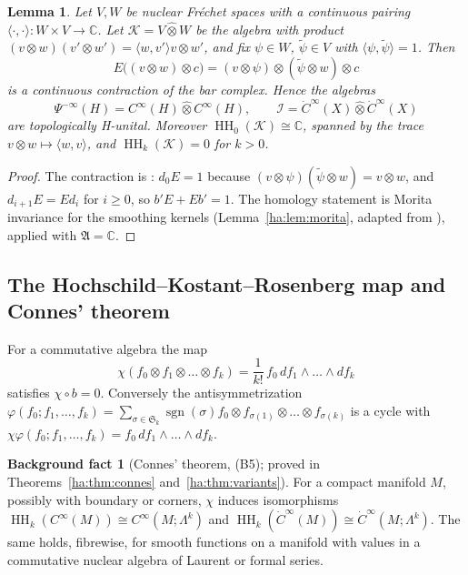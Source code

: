 \documentclass[11pt,oneside,reqno]{article}
\DeclareMathOperator{\HH}{HH}
\DeclareMathOperator{\sgn}{sgn}
\newcommand{\C}{\mathbb C}
\newcommand{\cI}{\mathcal I}
\newcommand{\CI}{C^\infty}
\newcommand{\dCI}{\dot C^\infty}
\theoremstyle{plain}
\newtheorem{lemma}[theorem]{Lemma}
\theoremstyle{definition}
\newtheorem{background}[theorem]{Background fact}
\theoremstyle{remark}
\begin{document}
\begin{lemma}\label{lem:Hunital}
Let \(V,W\) be nuclear Fr\'echet spaces with a continuous pairing
\(\langle\cdot,\cdot\rangle:W\times V\to\C\). Let \(\mathcal K=V\widehat
\otimes W\) be the algebra with product \((v\otimes w)(v'\otimes w')=\langle
w,v'\rangle v\otimes w'\), and fix \(\psi\in W\), \(\tilde\psi\in V\) with
\(\langle\psi,\tilde\psi\rangle=1\). Then
\[
 E\bigl((v\otimes w)\otimes c\bigr)=(v\otimes\psi)\otimes(\tilde\psi\otimes
 w)\otimes c
\]
is a continuous contraction of the bar complex. Hence the algebras
\[
 \Psi^{-\infty}(H)=\CI(H)\widehat\otimes\CI(H),\qquad
 \cI=\dCI(X)\widehat\otimes\dCI(X)
\]
are topologically H-unital.
Moreover \(\HH_0(\mathcal K)\cong\C\), spanned by the trace
\(v\otimes w\mapsto\langle w,v\rangle\), and \(\HH_k(\mathcal K)=0\) for
\(k>0\).
\end{lemma}

\begin{proof}
The contraction is \cite[Lemma ``Explicit contractions'']{HHb}:
\(d_0E=1\) because \((v\otimes\psi)(\tilde\psi\otimes w)=v\otimes w\), and
\(d_{i+1}E=Ed_i\) for \(i\ge0\), so \(b'E+Eb'=1\). The homology statement is
Morita invariance for the smoothing kernels
(Lemma~\ref{ha:lem:morita}, adapted from \cite[Lemma ``Morita invariance
for smoothing kernels'']{HHb}), applied with \(\mathfrak A=\C\).
\end{proof}

\subsection{The Hochschild--Kostant--Rosenberg map and Connes' theorem}
\label{subsec:HKR}
For a commutative algebra the map \cite[after (26)]{MN}
\[
 \chi(f_0\otimes f_1\otimes\dots\otimes f_k)=\frac1{k!}\,f_0\,df_1\wedge
 \dots\wedge df_k
\]
satisfies \(\chi\circ b=0\). Conversely the antisymmetrization
\(\varphi(f_0;f_1,\dots,f_k)=\sum_{\sigma\in\mathfrak S_k}\sgn(\sigma)f_0
\otimes f_{\sigma(1)}\otimes\dots\otimes f_{\sigma(k)}\) is a cycle with
\(\chi\varphi(f_0;f_1,\dots,f_k)=f_0\,df_1\wedge\dots\wedge df_k\).

\begin{background}[Connes' theorem, (B5); proved in Theorems~\ref{ha:thm:connes} and~\ref{ha:thm:variants}]\label{bg:connes}
For a compact manifold \(M\), possibly with boundary or corners, \(\chi\)
induces isomorphisms \(\HH_k(\CI(M))\cong\CI(M;\Lambda^k)\) and
\(\HH_k(\dCI(M))\cong\dCI(M;\Lambda^k)\). The same holds, fibrewise, for
smooth functions on a manifold with values in a commutative nuclear
algebra of Laurent or formal series.
\end{background}
\end{document}
